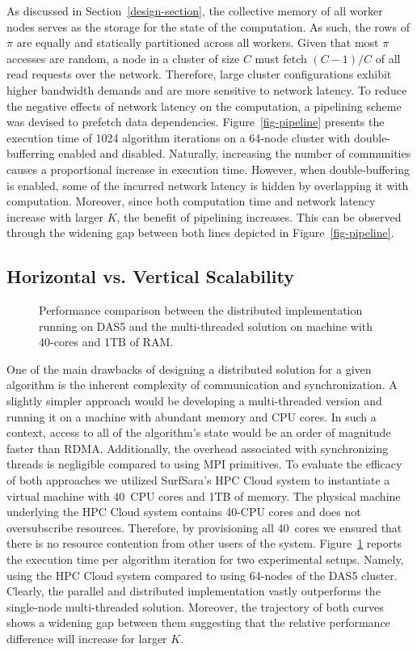 As discussed in Section~\ref{design-section}, the collective memory of all
worker nodes serves as the storage for the state of the computation. As such,
the rows of $\pi$ are equally and statically partitioned across all workers.
Given that most $\pi$ accesses are random, a node in a cluster of size $C$ must
fetch $(C-1)/C$ of all read requests over the network. Therefore, large cluster
configurations exhibit higher bandwidth demands and are more sensitive
to network latency. To reduce the negative effects of network latency on the
computation, a pipelining scheme was devised to prefetch data dependencies.
Figure~\ref{fig-pipeline} presents the execution time of 1024 algorithm
iterations on a 64-node cluster with double-bufferring enabled and disabled.
Naturally, increasing the number of communities causes a proportional increase
in execution time. However, when double-buffering is enabled, some of the
incurred network latency is hidden by overlapping it with computation.
Moreover, since both computation time and network latency increase with larger
$K$, the benefit of pipelining increases. This can be observed through the
widening gap between both lines depicted in Figure~\ref{fig-pipeline}.

\subsection{Horizontal vs. Vertical Scalability}
\begin{figure}[t] %
  \centering
  \caption{Performance comparison between the distributed implementation
  running on DAS5 and the multi-threaded solution on machine with 40-cores and
  1TB of RAM.}
  \label{fig-scale-up}
\end{figure}
One of the main drawbacks of designing a distributed solution for a given
algorithm is the inherent complexity of communication and synchronization. A
slightly simpler approach would be developing a multi-threaded version and
running it on a machine with abundant memory and CPU cores. In such a context,
access to all of the algorithm's state would be an order of magnitude faster
than RDMA. Additionally, the overhead associated with synchronizing threads is
negligible compared to using MPI primitives. To evaluate the efficacy of both
approaches we utilized SurfSara's HPC Cloud system to instantiate a virtual
machine with 40~CPU cores and 1TB of memory. The physical machine underlying
the HPC Cloud system contains 40-CPU cores and does not oversubscribe
resources. Therefore, by provisioning all 40~cores we ensured that there is no
resource contention from other users of the system. Figure~\ref{fig-scale-up}
reports the execution time per algorithm iteration for two experimental setups.
Namely, using the HPC Cloud system compared to using 64-nodes of the DAS5
cluster. Clearly, the parallel and distributed implementation vastly
outperforms the single-node multi-threaded solution. Moreover, the trajectory
of both curves shows a widening gap between them suggesting that the relative
performance difference will increase for larger $K$.


